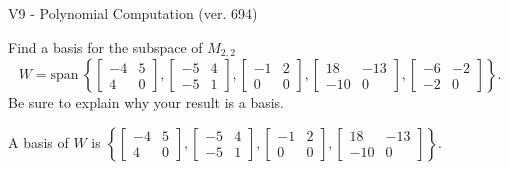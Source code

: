 \begin{exercise}
  \begin{exerciseTitle}V9 - Polynomial Computation (ver. 694)\end{exerciseTitle}
  \begin{exerciseStatement}
    Find a basis for the subspace of \(M_{2,2}\) 
\[W=\mathrm{span}\ \left\{\left[\begin{array}{cc}
-4 & 5 \\
4 & 0
\end{array}\right] , \left[\begin{array}{cc}
-5 & 4 \\
-5 & 1
\end{array}\right] , \left[\begin{array}{cc}
-1 & 2 \\
0 & 0
\end{array}\right] , \left[\begin{array}{cc}
18 & -13 \\
-10 & 0
\end{array}\right] , \left[\begin{array}{cc}
-6 & -2 \\
-2 & 0
\end{array}\right]\right\}.\]
 Be sure to explain why your result is a basis.


  \end{exerciseStatement}
  \begin{exerciseAnswer}
   A basis of \(W\) is  \(\left\{\left[\begin{array}{cc}
-4 & 5 \\
4 & 0
\end{array}\right] , \left[\begin{array}{cc}
-5 & 4 \\
-5 & 1
\end{array}\right] , \left[\begin{array}{cc}
-1 & 2 \\
0 & 0
\end{array}\right] , \left[\begin{array}{cc}
18 & -13 \\
-10 & 0
\end{array}\right]\right\}\).
  


  \end{exerciseAnswer}
\end{exercise}
